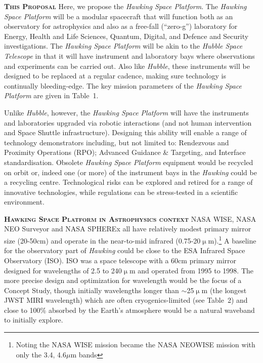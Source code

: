 \documentclass[a4paper,12pt]{article}
\begin{document}
\smallskip \smallskip
\noindent
{\bfseries \textsc{\textcolor{Cerulean}{This Proposal}}}
Here, we propose 
the \textit{Hawking Space
Platform}. The \textit{Hawking Space Platform} will be a %
modular spacecraft that will function both as an observatory for
astrophysics and also as a free-fall (``zero-g'') laboratory for
Energy, Health and Life Sciences, Quantum, Digital, and Defence and Security  
investigations.  The \textit{Hawking Space
Platform} will be akin to the \textit{Hubble Space Telescope} in that
it will have instrument and laboratory bays where observations
and experiments can be carried out. Also like \textit{Hubble}, these
instruments will be designed to be replaced at a regular cadence,
making sure technology is continually bleeding-edge.
The key mission parameters of the \textit{Hawking Space Platform} are given in Table~1.

\smallskip \smallskip
\noindent
Unlike \textit{Hubble}, however, the \textit{Hawking Space Platform} will
have the instruments and laboratories upgraded via robotic
interactions (and not human intervention and Space Shuttle
infrastructure).  Designing this ability will enable a range of
technology demonstrators including, but not limited to: Rendezvous and
Proximity Operations (RPO); Advanced Guidance \& Targeting, and
Interface standardisation.  Obsolete \textit{Hawking
Space Platform} equipment would be recycled on orbit or, indeed one (or more) 
of the instrument bays in the \textit{Hawking} could be a recycling
centre. Technological risks can be explored  and retired for a range of
innovative technologies, while regulations can be stress-tested in a
scientific environment.

\smallskip \smallskip
\noindent
{\bfseries \textsc{\textcolor{Cerulean}{Hawking Space Platform in Astrophysics context}}}
NASA WISE, %
NASA NEO Surveyor and %
NASA SPHEREx %
all have relatively modest primary mirror size (20-50cm) and operate
in the near-to-mid infrared (0.75-20$\upmu$m).\footnote{Noting the
NASA WISE mission became the NASA NEOWISE mission with only the 3.4,
4.6$\mu$m bands} 
A baseline for the observatory part of \textit{Hawking} could be close 
to the ESA Infrared Space Observatory (ISO). 
ISO was a 
space telescope with a 60cm primary mirror designed for wavelengths of 2.5 to 240$\upmu$m and
operated from 1995 to 1998.  The more precise design and optimization
for wavelength would be the focus of a Concept Study, though initially
wavelengths longer than $\sim$25$\upmu$m (the longest JWST MIRI
wavelength) which are often cryogenics-limited (see
Table~2) and close to 100\% absorbed by the Earth's atmosphere would be a natural waveband to initially explore.
\end{document}
